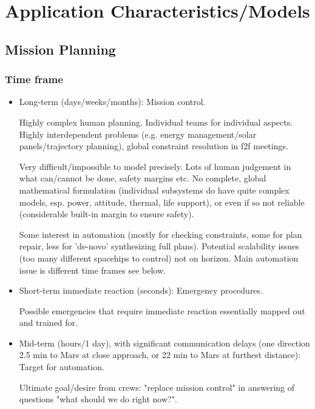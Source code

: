 \section{Application Characteristics/Models}

\subsection{Mission Planning}

\subsubsection{Time frame}

\begin{itemize}
\item Long-term (days/weeks/months): Mission control.

    Highly complex human planning. Individual teams for individual
    aspects. Highly interdependent problems (e.g. energy
    management/solar panels/trajectory planning), global constraint
    resolution in f2f meetings.
    
    Very difficult/impossible to model precisely. Lots of human
    judgement in what can/cannot be done, safety margins etc. No
    complete, global mathematical formulation (individual subsystems
    do have quite complex models, esp. power, attitude, thermal, life
    support), or even if so not reliable (considerable built-in margin
    to ensure safety).
    
    Some interest in automation (mostly for checking constraints, some
    for plan repair, less for 'de-novo' synthesizing full
    plans). Potential scalability issues (too many different spacehips
    to control) not on horizon. Main automation issue is different
    time frames see below.
    
\item Short-term immediate reaction (seconds): Emergency procedures.

    Possible emergencies that require immediate reaction essentially
    mapped out and trained for.

\item Mid-term (hours/1 day), with significant communication delays
  (one direction 2.5 min to Mars at close approach, or 22 min to Mars
  at furthest distance): Target for automation.

    Ultimate goal/desire from crews: "replace mission control" in
    answering of questions "what should we do right now?".
    
\end{itemize}


